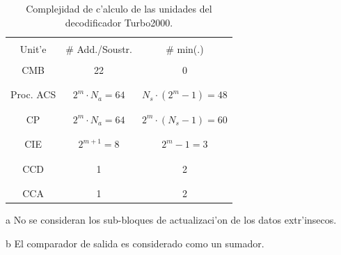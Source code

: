\begin{table}[H]
	\begin{center}
	\begin{threeparttable}
	\begin{tabular}{ | c || c | c | }
		\hline
		& & \\[-8pt]
		Unit'e	&	\# Add./Soustr.	&	\# min(.)	\\[3pt]
		\hline \hline
		& & \\[-18pt]CMB			&	22					&	0					\\& & \\[-18pt]\hline
		& & \\[-18pt]Proc. ACS		&	$2^m \cdot N_a = 64$	&	$N_s \cdot (2^m-1)=48$	\\& & \\[-18pt]\hline
		& & \\[-18pt]CP			&	$2^m \cdot N_a = 64$	&	$2^m \cdot (N_s-1)=60$	\\& & \\[-18pt]\hline
		& & \\[-18pt]CIE\tnote{a}	&	$2^{m+1} = 8$		&	$2^m-1=3$			\\& & \\[-18pt]\hline
		& & \\[-18pt]CCD\tnote{b}	&	1					&	2					\\& & \\[-18pt]\hline
		& & \\[-18pt]CCA\tnote{b}	&	1					&	2					\\
		\hline
	\end{tabular}
	\begin{tablenotes}
		\item[\tiny a]{\tiny No se consideran los sub-bloques de actualizaci'on de los datos extr'insecos.}
		\item[\tiny b]{\tiny El comparador de salida es considerado como un sumador.}
	\end{tablenotes}
	\end{threeparttable}
	\end{center}
	\caption{Complejidad de c'alculo de las unidades del decodificador Turbo2000.}
\end{table}

